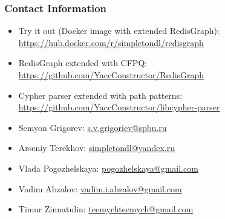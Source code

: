 \documentclass[xcolor=table,aspectratio=169]{beamer}
\begin{document}
\begin{frame}
\frametitle{Contact Information}
\begin{minipage}[t]{0.8\textwidth}
\begin{itemize}
  \item Try it out (Docker image with extended RedisGraph): \url{https://hub.docker.com/r/simpletondl/redisgraph}
  \item RedisGraph extended with CFPQ: \url{https://github.com/YaccConstructor/RedisGraph}
  \item Cypher parser extended with path patterns: \url{https://github.com/YaccConstructor/libcypher-parser}

  \vspace{0.5cm}
  \pause
  \item Semyon Grigorev: \href{mailto:s.v.grigoriev@spbu.ru}{s.v.grigoriev@spbu.ru}
  \item Arseniy Terekhov: \href{mailto:simpletondl@yandex.ru}{simpletondl@yandex.ru}
  \item Vlada Pogozhelskaya: \href{mailto:pogozhelskaya@gmail.com}{pogozhelskaya@gmail.com}
  \item Vadim Abzalov: \href{mailto:vadim.i.abzalov@gmail.com}{vadim.i.abzalov@gmail.com}
  \item Timur Zinnatulin: \href{mailto:teemychteemych@gmail.com}{teemychteemych@gmail.com}
\end{itemize}
\end{minipage}~
\begin{minipage}[t]{0.19\textwidth}
\pause
\vspace{2.5cm}
\end{minipage}
\end{frame}
\end{document}
